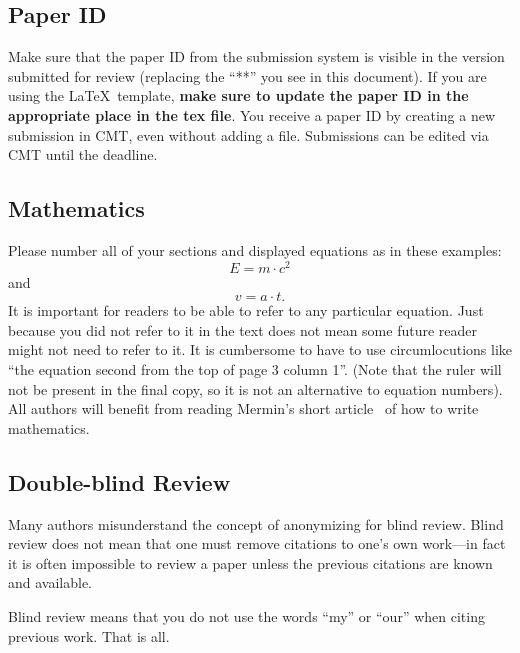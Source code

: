 \subsection{Paper ID}
Make sure that the paper ID from the submission system is visible in the version submitted for review (replacing the ``**'' you see in this document).
If you are using the \LaTeX\ template, \textbf{make sure to update the paper ID in the appropriate place in the tex file}.
You receive a paper ID by creating a new submission in CMT, even without adding a file.
Submissions can be edited via CMT until the deadline.


\subsection{Mathematics}

Please number all of your sections and displayed equations as in these examples:
\begin{equation}
  E = m\cdot c^2
  \label{eq:important}
\end{equation}
and
\begin{equation}
  v = a\cdot t.
  \label{eq:also-important}
\end{equation}
It is important for readers to be able to refer to any particular equation.
Just because you did not refer to it in the text does not mean some future reader might not need to refer to it.
It is cumbersome to have to use circumlocutions like ``the equation second from the top of page 3 column 1''.
(Note that the ruler will not be present in the final copy, so it is not an alternative to equation numbers).
All authors will benefit from reading Mermin's short article~\cite{Mermin89} of how to write mathematics.

\subsection{Double-blind Review}

Many authors misunderstand the concept of anonymizing for blind review.
Blind review does not mean that one must remove citations to one's own work---in fact it is often impossible to review a paper unless the previous citations are known and available.

Blind review means that you do not use the words ``my'' or ``our'' when citing previous work.
That is all.

